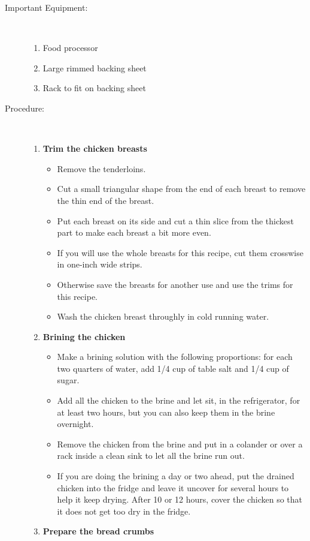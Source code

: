 \documentclass[11pt,letterpaper]{article}
\begin{document}
\begin{description}
\item[Important Equipment:]\ \\
	\begin{enumerate}
	\item Food processor
	\item Large rimmed backing sheet
	\item Rack to fit on backing sheet
	\end{enumerate}
\item[Procedure:]\ \\
	\begin{enumerate}
	\item {\bf Trim the chicken breasts}
	\begin{itemize}
	\item Remove the tenderloins.
	\item Cut a small triangular shape from the end of each breast to remove the thin end of the breast.
	\item Put each breast on its side and cut a thin slice from the thickest part to make each breast a bit more even.
	\item If you will use the whole breasts for this recipe, cut them crosswise in one-inch wide strips.
	\item Otherwise save the breasts for another use and use the trims for this recipe.
	\item Wash the chicken breast throughly in cold running water.
	\end{itemize}
	\item {\bf Brining the chicken}
	\begin{itemize}
	\item Make a brining solution with the following proportions: for each  two quarters of water, add 1/4 cup of table salt and 1/4 cup of sugar.
	 \item Add all the chicken to the brine and let sit, in the refrigerator, for at least two hours, but you can also keep them in the brine overnight.
	 \item Remove the chicken from the brine and put in a colander or over a rack inside a clean sink to let all the brine run out. 
	 \item If you are doing the brining a day or two ahead, put the drained chicken into the fridge and leave it uncover for several hours to help it keep drying. After 10 or 12 hours, cover the chicken so that it does not get too dry in the fridge.
	 \end{itemize}
	  \item {\bf Prepare the bread crumbs}

\end{enumerate}
\end{description}
\end{document}
